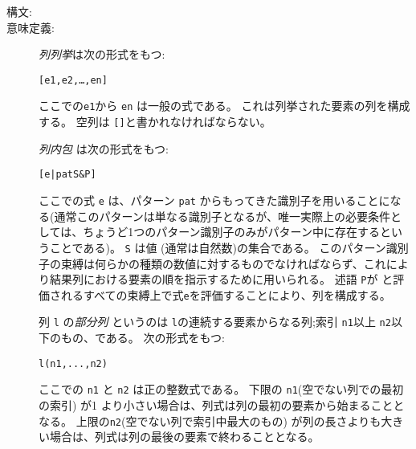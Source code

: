 \documentclass[\pformat,12pt]{jarticle}
\begin{document}
\begin{description}
\item[構文:]




\item[意味定義:]  {\it 列列挙}は次の形式をもつ:
  \begin{alltt}
    [e1, e2, \ldots, en]
  \end{alltt}
  ここでの{\tt e1}から {\tt en} は一般の式である。 
これは列挙された要素の列を構成する。
空列は {\tt []}と書かれなければならない。

   {\it 列内包} は次の形式をもつ:
  \begin{alltt}
    [e | pat  S \& P]
  \end{alltt}
 ここでの式 {\tt e} は、パターン {\tt pat} からもってきた識別子を用いることになる(通常このパターンは単なる識別子となるが、唯一実際上の必要条件としては、ちょうど1つのパターン識別子のみがパターン中に存在するということである)。 
{\tt S} は値 (通常は自然数)の集合である。
このパターン識別子の束縛は何らかの種類の数値に対するものでなければならず、これにより結果列における要素の順を指示するために用いられる。
述語 {\tt P}が と評価されるすべての束縛上で式{\tt e}を評価することにより、列を構成する。

列 {\tt l} の{\it 部分列} というのは {\tt l}の連続する要素からなる列;索引 {\tt n1}以上 {\tt n2}以下のもの、である。 
次の形式をもつ:
  \begin{alltt}
    l(n1, ..., n2)
  \end{alltt}
 ここでの {\tt n1} と {\tt n2} は正の整数式である。
 下限の {\tt n1}(空でない列での最初の索引) が1 より小さい場合は、列式は列の最初の要素から始まることとなる。
上限の{\tt n2}(空でない列で索引中最大のもの) が列の長さよりも大きい場合は、列式は列の最後の要素で終わることとなる。



\end{description}
\end{document}
